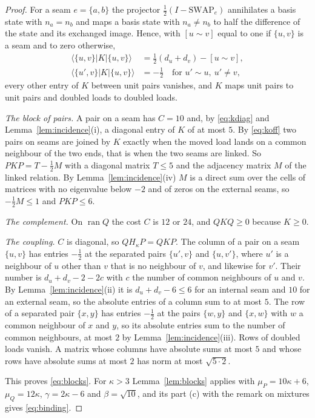 \documentclass[11pt]{article}
\theoremstyle{definition}
\theoremstyle{remark}
\theoremstyle{plain}
\newcommand{\ket}[1]{\lvert #1\rangle}
\newcommand{\bra}[1]{\langle #1\rvert}
\newcommand{\ran}{\operatorname{ran}}
\newcommand{\SWAP}{\mathrm{SWAP}}
\begin{document}
\begin{proof}
For a seam $e=\{a,b\}$ the projector $\tfrac12(I-\SWAP_e)$ annihilates a
basis state with $n_a=n_b$ and maps a basis state with $n_a\neq n_b$ to
half the difference of the state and its exchanged image. Hence, with
$[u\sim v]$ equal to one if $\{u,v\}$ is a seam and to zero otherwise,
\begin{align}
\bra{\{u,v\}}K\ket{\{u,v\}}&=\tfrac12(d_u+d_v)-[u\sim v], \label{eq:kdiag}\\
\bra{\{u',v\}}K\ket{\{u,v\}}&=-\tfrac12\quad\text{for }u'\sim u,\ u'\neq v, \label{eq:koff}
\end{align}
every other entry of $K$ between unit pairs vanishes, and $K$ maps unit
pairs to unit pairs and doubled loads to doubled loads.

\emph{The block of pairs.} A pair on a seam has $C=10$ and, by
\eqref{eq:kdiag} and Lemma~\ref{lem:incidence}(i), a diagonal entry of $K$
of at most $5$. By \eqref{eq:koff} two pairs on seams are joined by $K$
exactly when the moved load lands on a common neighbour of the two ends,
that is when the two seams are linked. So $PKP=T-\tfrac12M$ with a diagonal
matrix $T\le5$ and the adjacency matrix $M$ of the linked relation. By
Lemma~\ref{lem:incidence}(iv) $M$ is a direct sum over the cells of
matrices with no eigenvalue below $-2$ and of zeros on the external seams,
so $-\tfrac12M\le1$ and $PKP\le6$.

\emph{The complement.} On $\ran Q$ the cost $C$ is $12$ or $24$, and
$QKQ\ge0$ because $K\ge0$.

\emph{The coupling.} $C$ is diagonal, so $QH_\kappa P=QKP$. The column of a
pair on a seam $\{u,v\}$ has entries $-\tfrac12$ at the separated pairs
$\{u',v\}$ and $\{u,v'\}$, where $u'$ is a neighbour of $u$ other than $v$
that is no neighbour of $v$, and likewise for $v'$. Their number is
$d_u+d_v-2-2c$ with $c$ the number of common neighbours of $u$ and $v$. By
Lemma~\ref{lem:incidence}(ii) it is $d_u+d_v-6\le6$ for an internal seam and
$10$ for an external seam, so the absolute entries of a column sum to at
most $5$. The row of a separated pair $\{x,y\}$ has entries $-\tfrac12$ at
the pairs $\{w,y\}$ and $\{x,w\}$ with $w$ a common neighbour of $x$ and
$y$, so its absolute entries sum to the number of common neighbours, at
most $2$ by Lemma~\ref{lem:incidence}(iii). Rows of doubled loads vanish. A
matrix whose columns have absolute sums at most $5$ and whose rows have
absolute sums at most $2$ has norm at most $\sqrt{5\cdot2}$.

This proves \eqref{eq:blocks}. For $\kappa>3$ Lemma~\ref{lem:blocks}
applies with $\mu_P=10\kappa+6$, $\mu_Q=12\kappa$, $\gamma=2\kappa-6$ and
$\beta=\sqrt{10}$, and its part (c) with the remark on mixtures gives
\eqref{eq:binding}.
\end{proof}
\end{document}
